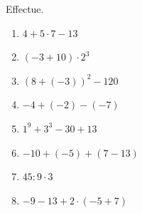 %
%
	Effectue.
	\begin{enumerate}[cols=2, itemsep=.2cm]
		\item \(4+5\cdot 7-13\)
		\item \(\left(-3+10\right)\cdot 2^3\)
		\item \(\left(8+(-3)\right)^2 - 120\)
		\item \(-4+(-2)-(-7)\)
		\item \(1^9 + 3^3 - 30 + 13\)
		\item \(-10+(-5) + \left(7-13\right)\)
		\item \(45:9\cdot 3 \)
		\item \(-9-13+2\cdot (-5+7)\)
	\end{enumerate}	

